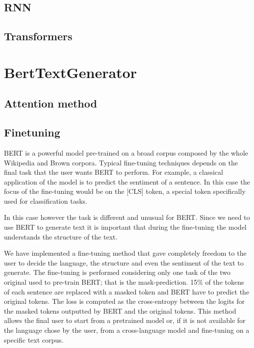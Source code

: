 \documentclass[10pt,twocolumn,letterpaper]{article}
\begin{document}
\subsection{RNN}

\subsection{Transformers}


\section{BertTextGenerator}


\subsection{Attention method}


\subsection{Finetuning}
BERT is a powerful model pre-trained on a broad corpus composed by the whole
Wikipedia and Brown corpora.
Typical fine-tuning techniques depends on the final task that the user wants BERT to perform.
For example, a classical application of the model is to predict the sentiment of a sentence.
In this case the focus of the fine-tuning would be on the [CLS] token,
a special token specifically used for classification tasks.

In this case however the task is different and unusual for BERT.
Since we need to use BERT to generate text it is important that during the
fine-tuning the model understands the structure of the text.

We have implemented a fine-tuning method that gave completely freedom to the user to decide the language,
the structure and even the sentiment of the text to generate.
The fine-tuning is performed considering only one task of the
two original used to pre-train BERT; that is the mask-prediction.
15\% of the tokens of each sentence are replaced with a masked token and
BERT have to predict the original tokens.
The loss is computed as the cross-entropy between the logits for the
masked tokens outputted by BERT and the original tokens.
This method allows the final user to start from a pretrained model or, if
it is not available for the language chose by the user, from a cross-language model
and fine-tuning on a specific text corpus.
\end{document}
